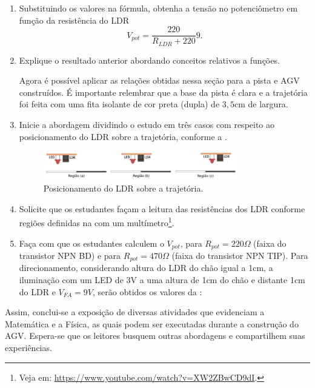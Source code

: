 \documentclass{textolivre}
\begin{document}
\begin{enumerate}
\item Substituindo os valores na fórmula, obtenha a tensão no potenciômetro em função da resistência do LDR 
$$ 
V_{pot} = \frac{220}{R_{LDR} + 220} 9 .
$$

\item Explique o resultado anterior abordando conceitos relativos a funções.

Agora é possível aplicar as relações obtidas nessa seção para a pista e AGV
construídos. É importante relembrar que a base da pista é clara e a trajetória
foi feita com uma fita isolante de cor preta (dupla) de $3,5$cm de largura.

\item Inicie a abordagem dividindo o estudo em três casos com respeito ao
posicionamento do LDR sobre a trajetória, conforme a .

\begin{figure}[h!]
\centering
\includegraphics[width=0.8\textwidth]{figure-35.pdf}
\caption{Posicionamento do LDR sobre a trajetória.}
\label{fig25}
\end{figure}

\item Solicite que os estudantes façam a leitura das resistências dos LDR
conforme regiões definidas na  com um multímetro\footnote{Veja em:
\url{https://www.youtube.com/watch?v=XW2ZBwCD9dI}.}.

\item Faça com que os estudantes calculem o $V_{pot}$, para $R_{pot} = 220\Omega$ (faixa do transistor NPN
BD) e para $R_{pot} = 470 \Omega$ (faixa do transistor NPN TIP). Para direcionamento, considerando
altura do LDR do chão igual a 1cm, a iluminação com um LED de 3V a uma altura
de 1cm do chão e distante 1cm do LDR e $V_{FA}=9V$, serão obtidos os valores da :

\end{enumerate}




Assim, conclui-se a exposição de diversas atividades que evidenciam a
Matemática e a Física, as quais podem ser executadas durante a construção do
AGV. Espera-se que os leitores busquem outras abordagens e compartilhem suas
experiências.
\end{document}
